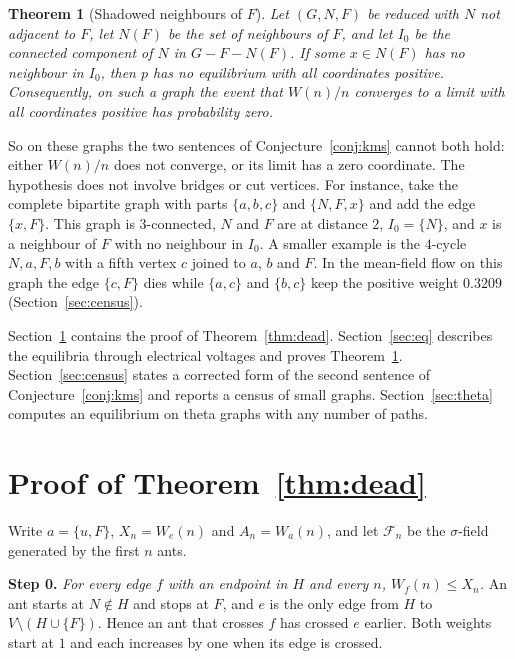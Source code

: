 \documentclass[11pt]{amsart}
\newtheorem{theorem}{Theorem}
\theoremstyle{remark}
\newcommand{\cF}{\mathcal{F}}
\begin{document}
\begin{theorem}[Shadowed neighbours of $F$]\label{thm:shadow}
Let $(G,N,F)$ be reduced with $N$ not adjacent to $F$, let $N(F)$ be the set of neighbours of $F$, and let $I_0$ be
the connected component of $N$ in $G-F-N(F)$. If some $x\in N(F)$ has no neighbour in $I_0$, then $p$ has no
equilibrium with all coordinates positive. Consequently, on such a graph the event that $W(n)/n$ converges to a limit
with all coordinates positive has probability zero.
\end{theorem}

So on these graphs the two sentences of Conjecture~\ref{conj:kms} cannot both hold: either $W(n)/n$ does not converge,
or its limit has a zero coordinate. The hypothesis does not involve bridges or cut vertices. For instance, take
the complete bipartite graph with parts $\{a,b,c\}$ and $\{N,F,x\}$ and add the edge $\{x,F\}$. This graph is
$3$-connected, $N$ and $F$ are at distance $2$, $I_0=\{N\}$, and $x$ is a neighbour of $F$ with no neighbour in $I_0$.
A smaller example is the $4$-cycle $N,a,F,b$ with a fifth vertex $c$ joined to $a$, $b$ and $F$. In the mean-field
flow on this graph the edge $\{c,F\}$ dies while $\{a,c\}$ and $\{b,c\}$ keep the positive weight $0.3209$
(Section~\ref{sec:census}).

Section~\ref{sec:proof} contains the proof of Theorem~\ref{thm:dead}. Section~\ref{sec:eq} describes the equilibria
through electrical voltages and proves Theorem~\ref{thm:shadow}. Section~\ref{sec:census} states a corrected form of
the second sentence of Conjecture~\ref{conj:kms} and reports a census of small graphs. Section~\ref{sec:theta}
computes an equilibrium on theta graphs with any number of paths.

\section{Proof of Theorem~\ref{thm:dead}}\label{sec:proof}

Write $a=\{u,F\}$, $X_n=W_e(n)$ and $A_n=W_a(n)$, and let $\cF_n$ be the $\sigma$-field generated by the first $n$
ants.

\medskip\noindent\textbf{Step 0.} \emph{For every edge $f$ with an endpoint in $H$ and every $n$, $W_f(n)\le X_n$.}
An ant starts at $N\notin H$ and stops at $F$, and $e$ is the only edge from $H$ to $V\setminus(H\cup\{F\})$. Hence an
ant that crosses $f$ has crossed $e$ earlier. Both weights start at $1$ and each increases by one when its edge is
crossed.
\end{document}
